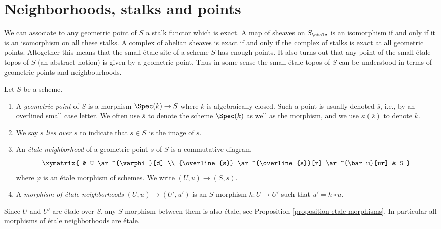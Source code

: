 \section{Neighborhoods, stalks and points}
\label{section-stalks}

\noindent
We can associate to any geometric point of $S$ a stalk functor which is
exact. A map of sheaves on $S_\etale$ is an isomorphism if and only
if it
is an isomorphism on all these stalks. A complex of abelian sheaves is
exact if and only if the complex of stalks is exact at all geometric points.
Altogether this means that the small \'etale site of a scheme $S$
has enough points. It also turns out that any point of the small \'etale topos
of $S$ (an abstract notion) is given by a geometric point.
Thus in some sense the small \'etale topos of $S$ can be understood in
terms of geometric points and neighbourhoods.

\begin{definition}
\label{definition-geometric-point}
Let $S$ be a scheme.
\begin{enumerate}
\item A {\it geometric point} of $S$ is a morphism
$\Spec(k) \to S$ where $k$ is algebraically closed.
Such a point is usually denoted $\overline{s}$, i.e., by an overlined
small case letter. We often use $\overline{s}$ to denote the scheme
$\Spec(k)$ as well as the morphism, and we use $\kappa(\overline{s})$
to denote $k$.
\item We say $\overline{s}$ {\it lies over} $s$
to indicate that $s \in S$ is the image of $\overline{s}$.
\item An {\it \'etale neighborhood} of a geometric point $\overline{s}$
of $S$ is a commutative diagram
$$
\xymatrix{
& U \ar^{\varphi}[d] \\
{\overline{s}} \ar^{\overline{s}}[r] \ar^{\bar u}[ur] & S
}
$$
where $\varphi$ is an \'etale morphism of schemes.
We write $(U, \overline{u}) \to (S, \overline{s})$.
\item A {\it morphism of \'etale neighborhoods}
$(U, \overline{u}) \to (U', \overline{u}')$
is an $S$-morphism $h: U \to U'$
such that $\overline{u}' = h \circ \overline{u}$.
\end{enumerate}
\end{definition}

\begin{remark}
\label{remark-etale-between-etale}
Since $U$ and $U'$ are \'etale over $S$, any $S$-morphism
between them is also \'etale, see
Proposition \ref{proposition-etale-morphisms}.
In particular all morphisms of \'etale neighborhoods are \'etale.
\end{remark}

